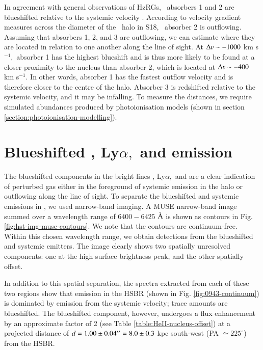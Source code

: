 In agreement with general observations of HzRGs, \lya~absorbers 1 and 2 are blueshifted relative to the systemic velocity \citep{wilman2004}. According to velocity gradient measures across the diameter of the \lya~halo in S18, \lya~absorber 2 is outflowing. Assuming that absorbers 1, 2, and 3 are outflowing, we can estimate where they are located in relation to one another along the line of sight. At $\Delta \varv \sim-1000$ km s$^{-1},$ absorber 1 has the highest blueshift and is thus more likely to be found at a closer proximity to the nucleus than absorber 2, which is located at $\Delta \varv \sim-400$ km s$^{-1}.$ In other words, absorber 1 has the fastest outflow velocity and is therefore closer to the centre of the halo. Absorber 3 is redshifted relative to the systemic velocity, and it may be infalling. To measure the distances, we require simulated abundances produced by photoionisation models (shown in section \ref{section:photoionisation-modelling}). 

\section{Blueshifted , Ly$\alpha,$ and  emission}\label{method:blueshifted-emission}

The blueshifted components in the bright lines , Ly$\alpha,$ and  are a clear indication of perturbed gas either in the foreground of systemic emission in the halo or outflowing along the line of sight. To separate the blueshifted and systemic emissions in , we used narrow-band imaging. A MUSE narrow-band image summed over a wavelength range of $6400 - 6425$ $\mbox{\normalfont\AA }$ is shown as contours in Fig. \ref{fig:hst-img-muse-contours}. We note that the contours are continuum-free. Within this chosen wavelength range, we obtain detections from the blueshifted and systemic  emitters. The image clearly shows two spatially unresolved components: one at the high surface brightness peak, and the other spatially offset. 

In addition to this spatial separation, the  spectra extracted from each of these two regions show that emission in the HSBR (shown in Fig. \ref{fig:0943-continuum}) is dominated by emission from the systemic velocity; trace amounts are blueshifted. The blueshifted component, however, undergoes a flux enhancement by an approximate factor of 2 (see Table \ref{table:HeII-nucleus-offset}) at a projected distance of $d = 1.00 \pm 0.04 ^{\prime\prime} = 8.0 \pm 0.3$ kpc south-west (PA $\simeq 225^\circ$) from the HSBR. 

